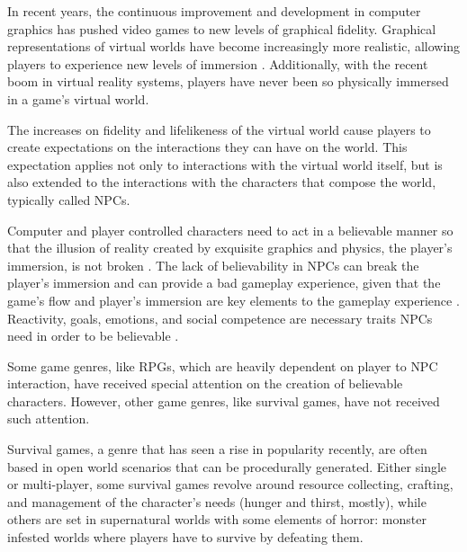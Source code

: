 \cleardoublepage
\label{chapter:introduction}

\noindent In recent years, the continuous improvement and development in computer graphics has pushed video games to new levels of graphical fidelity.
Graphical representations of virtual worlds have become increasingly more realistic, allowing players to experience new levels of immersion \cite{brown:immersion}.
Additionally, with the recent boom in virtual reality systems, players have never been so physically immersed in a game's virtual world.

The increases on fidelity and lifelikeness of the virtual world cause players to create expectations on the interactions they can have on the world.
This expectation applies not only to interactions with the virtual world itself, but is also extended to the interactions with the characters that compose the world, typically called \acp{NPC}.

Computer and player controlled characters need to act in a believable manner so that the illusion of reality created by exquisite graphics and physics, the player's immersion, is not broken \cite{thrainsson:emotion-games}.
The lack of believability in \acp{NPC} can break the player's immersion and can provide a bad gameplay experience, given that the game's flow and player's immersion are key elements to the gameplay experience \cite{ijsselsteijn:userexperience}.
Reactivity, goals, emotions, and social competence are necessary traits \acp{NPC} need in order to be believable \cite{bates:emotioninagents}.

Some game genres, like \acp{RPG}, which are heavily dependent on player to \ac{NPC} interaction, have received special attention on the creation of believable characters.
However, other game genres, like survival games, have not received such attention.

Survival games, a genre that has seen a rise in popularity recently, are often based in open world scenarios that can be procedurally generated.
Either single or multi-player, some survival games revolve around resource collecting, crafting, and management of the character's needs (hunger and thirst, mostly), while others are set in supernatural worlds with some elements of horror: monster infested worlds where players have to survive by defeating them.

